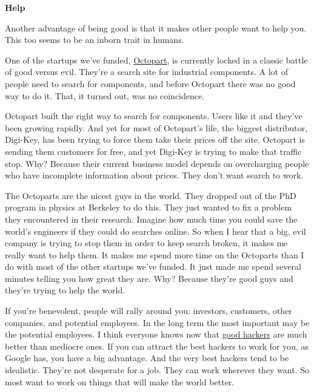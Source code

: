 \textbf{Help}

Another advantage of being good is that it makes
                  other people want to help you. This too seems to be an inborn
                  trait in humans.

One of the startups we've funded,
                  \href{http://octopart.com}{Octopart}, is currently
                  locked in a classic battle of good versus evil. They're a
                  search site for industrial components. A lot of people need to
                  search for components, and before Octopart there was no good
                  way to do it. That, it turned out, was no coincidence.

Octopart
                  built the right way to search for components. Users like it
                  and they've been growing rapidly. And yet for most of
                  Octopart's life, the biggest distributor, Digi-Key, has been
                  trying to force them take their prices off the site. Octopart
                  is sending them customers for free, and yet Digi-Key is trying
                  to make that traffic stop. Why? Because their current business
                  model depends on overcharging people who have incomplete
                  information about prices. They don't want search to work.

The
                  Octoparts are the nicest guys in the world. They dropped out
                  of the PhD program in physics at Berkeley to do this. They
                  just wanted to fix a problem they encountered in their
                  research. Imagine how much time you could save the world's
                  engineers if they could do searches online. So when I hear
                  that a big, evil company is trying to stop them in order to
                  keep search broken, it makes me really want to help them. It
                  makes me spend more time on the Octoparts than I do with most
                  of the other startups we've funded. It just made me spend
                  several minutes telling you how great they are. Why? Because
                  they're good guys and they're trying to help the world.

If
                  you're benevolent, people will rally around you: investors,
                  customers, other companies, and potential employees. In the
                  long term the most important may be the potential employees. I
                  think everyone knows now that
                  \href{http://www.paulgraham.com/gh.html}{good hackers} are much better than
                  mediocre ones. If you can attract the best hackers to work for
                  you, as Google has, you have a big advantage. And the very
                  best hackers tend to be idealistic. They're not desperate for
                  a job. They can work wherever they want. So most want to work
                  on things that will make the world better.

